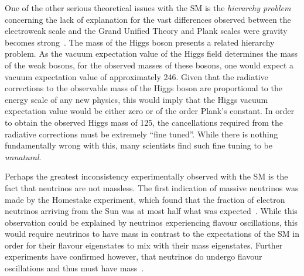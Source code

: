 One of the other serious theoretical issues with the SM is the \emph{hierarchy problem} concerning the lack of explanation for the vast differences observed between the electroweak scale and the Grand Unified Theory and Plank scales were gravity becomes strong~\cite{Burdman:2007ck}.
The mass of the Higgs boson presents a related hierarchy problem.
As the vacuum expectation value of the Higgs field determines the mass of the weak bosons, for the observed masses of these bosons, one would expect a vacuum expectation value of approximately 246\GeV.
Given that the radiative corrections to the observable mass of the Higgs boson are proportional to the energy scale of any new physics, this would imply that the Higgs vacuum expectation value would be either zero or of the order Plank's constant.
In order to obtain the observed Higgs mass of 125\GeV, the cancellations required from the radiative corrections must be extremely ``fine tuned''.
While there is nothing fundamentally wrong with this, many scientists find such fine tuning to be \emph{unnatural}.


Perhaps the greatest inconsistency experimentally observed with the SM is the fact that neutrinos are not massless.
The first indication of massive neutrinos was made by the Homestake experiment, which found that the fraction of electron neutrinos arriving from the Sun was at most half what was expected~\cite{PhysRevLett.20.1205}.
While this observation could be explained by neutrinos experiencing flavour oscillations, this would require neutrinos to have mass in contrast to the expectations of the SM in order for their flavour eigenstates to mix with their mass eigenstates.
Further experiments have confirmed however, that neutrinos do undergo flavour oscillations and thus must have mass~\cite{Fukuda:1998mi,Ahmad:2001an,PhysRevD.88.032002}.

